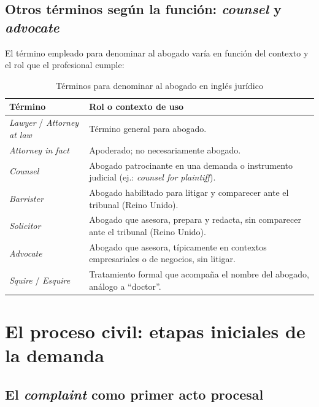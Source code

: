 \documentclass[12pt,oneside]{book}
\begin{document}
\section{Otros términos según la función: \textit{counsel} y \textit{advocate}}

El término empleado para denominar al abogado varía en función del contexto y el rol que el profesional cumple:

\begin{table}[H]
\centering
\caption{Términos para denominar al abogado en inglés jurídico}
\begin{tabularx}{\textwidth}{
    >{\raggedright\arraybackslash}p{}
    >{\raggedright\arraybackslash}X
}
\toprule
\textbf{Término} & \textbf{Rol o contexto de uso} \\
\midrule
\textit{Lawyer} / \textit{Attorney at law} & Término general para abogado. \\
\addlinespace
\textit{Attorney in fact} & Apoderado; no necesariamente abogado. \\
\addlinespace
\textit{Counsel} & Abogado patrocinante en una demanda o instrumento judicial (ej.: \textit{counsel for plaintiff}). \\
\addlinespace
\textit{Barrister} & Abogado habilitado para litigar y comparecer ante el tribunal (Reino Unido). \\
\addlinespace
\textit{Solicitor} & Abogado que asesora, prepara y redacta, sin comparecer ante el tribunal (Reino Unido). \\
\addlinespace
\textit{Advocate} & Abogado que asesora, típicamente en contextos empresariales o de negocios, sin litigar. \\
\addlinespace
\textit{Squire} / \textit{Esquire} & Tratamiento formal que acompaña el nombre del abogado, análogo a ``doctor''. \\
\bottomrule
\end{tabularx}
\end{table}

\chapter{El proceso civil: etapas iniciales de la demanda}

\section{El \textit{complaint} como primer acto procesal}
\end{document}
